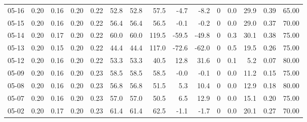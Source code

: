 \begin{threeparttable}
{\begin{tabular}{lrrrrrrrrrrrrrr}
  05-16 &          0.20 &          0.16 &          0.20 &        0.22 &                52.8 &               52.8 &                57.5 &       -4.7 &         -8.2 &              0 &                 0.0 &             29.9 &            0.39 &                  65.00 \\
  05-15 &          0.20 &          0.16 &          0.20 &        0.22 &                56.4 &               56.4 &                56.5 &       -0.1 &         -0.2 &              0 &                 0.0 &             29.0 &            0.37 &                  70.00 \\
  05-14 &          0.20 &          0.17 &          0.20 &        0.22 &                60.0 &               60.0 &               119.5 &      -59.5 &        -49.8 &              0 &                 0.3 &             30.1 &            0.38 &                  75.00 \\
  05-13 &          0.20 &          0.15 &          0.20 &        0.22 &                44.4 &               44.4 &               117.0 &      -72.6 &        -62.0 &              0 &                 0.5 &             19.5 &            0.26 &                  75.00 \\
  05-12 &          0.20 &          0.16 &          0.20 &        0.22 &                53.3 &               53.3 &                40.5 &       12.8 &         31.6 &              0 &                 0.1 &              5.2 &            0.07 &                  80.00 \\
  05-09 &          0.20 &          0.16 &          0.20 &        0.23 &                58.5 &               58.5 &                58.5 &       -0.0 &         -0.1 &              0 &                 0.0 &             11.2 &            0.15 &                  75.00 \\
  05-08 &          0.20 &          0.16 &          0.20 &        0.23 &                56.8 &               56.8 &                51.5 &        5.3 &         10.4 &              0 &                 0.0 &             12.9 &            0.18 &                  80.00 \\
  05-07 &          0.20 &          0.16 &          0.20 &        0.23 &                57.0 &               57.0 &                50.5 &        6.5 &         12.9 &              0 &                 0.0 &             15.1 &            0.20 &                  75.00 \\
  05-02 &          0.20 &          0.17 &          0.20 &        0.23 &                61.4 &               61.4 &                62.5 &       -1.1 &         -1.7 &              0 &                 0.0 &             20.1 &            0.27 &                  70.00 \\

\end{tabular}}
\end{threeparttable}
